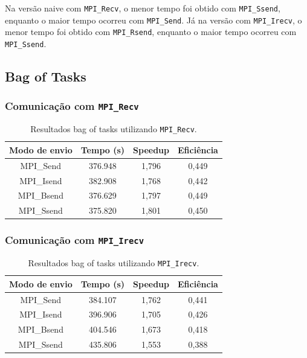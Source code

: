 \documentclass[12pt,a4paper]{article}
\begin{document}
Na versão naive com \texttt{MPI\_Recv}, o menor tempo foi obtido com \texttt{MPI\_Ssend}, enquanto o maior tempo ocorreu com \texttt{MPI\_Send}. Já na versão com \texttt{MPI\_Irecv}, o menor tempo foi obtido com \texttt{MPI\_Rsend}, enquanto o maior tempo ocorreu com \texttt{MPI\_Ssend}.

\subsection{Bag of Tasks}

\subsubsection{Comunicação com \texttt{MPI\_Recv}}
\begin{table}[H]
\centering
\begin{tabular}{|c|c|c|c|}
\hline
\textbf{Modo de envio} & \textbf{Tempo (s)} & \textbf{Speedup} & \textbf{Eficiência} \\
\hline
MPI\_Send & 376.948 & 1,796 & 0,449 \\
\hline
MPI\_Isend & 382.908 & 1,768 & 0,442 \\
\hline
MPI\_Bsend & 376.629 & 1,797 & 0,449 \\
\hline
MPI\_Ssend & 375.820 & 1,801 & 0,450 \\
\hline
\end{tabular}
\caption{Resultados bag of tasks utilizando \texttt{MPI\_Recv}.}
\end{table}

\subsubsection{Comunicação com \texttt{MPI\_Irecv}}
\begin{table}[H]
\centering
\begin{tabular}{|c|c|c|c|}
\hline
\textbf{Modo de envio} & \textbf{Tempo (s)} & \textbf{Speedup} & \textbf{Eficiência} \\
\hline
MPI\_Send & 384.107 & 1,762 & 0,441 \\
\hline
MPI\_Isend & 396.906 & 1,705 & 0,426 \\
\hline
MPI\_Bsend & 404.546 & 1,673 & 0,418 \\
\hline
MPI\_Ssend & 435.806 & 1,553 & 0,388 \\
\hline
\end{tabular}
\caption{Resultados bag of tasks utilizando \texttt{MPI\_Irecv}.}
\end{table}
\end{document}
